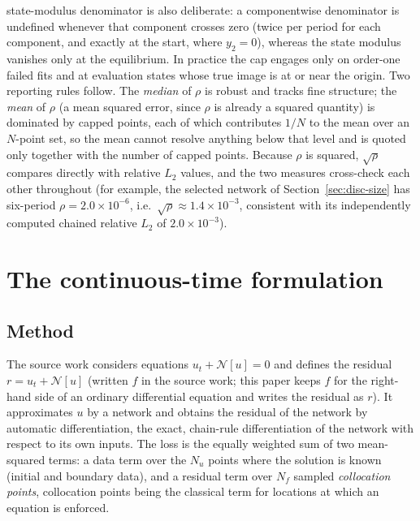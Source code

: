 \documentclass[11pt,a4paper]{article}
\begin{document}
\begin{enumerate}
  state-modulus denominator is also deliberate: a
  componentwise denominator is undefined whenever that component crosses
  zero (twice per period for each component, and exactly at the start,
  where $y_2 = 0$), whereas the state modulus vanishes only at the
  equilibrium. In practice the cap engages only on order-one failed fits
  and at evaluation states whose true image is at or near the origin.
  Two reporting rules follow. The \emph{median} of $\rho$ is robust and
  tracks fine structure; the \emph{mean} of $\rho$ (a mean squared
  error, since $\rho$ is already a squared quantity) is dominated by
  capped points, each of which contributes $1/N$ to the mean over an
  $N$-point set, so the mean cannot resolve anything below that level
  and is quoted only together with the number of capped points. Because
  $\rho$ is squared, $\sqrt{\rho}$ compares directly with relative $L_2$
  values, and the two measures cross-check each other throughout (for
  example, the selected network of Section~\ref{sec:disc-size} has
  six-period $\rho = 2.0\times10^{-6}$, i.e.\
  $\sqrt{\rho} \approx 1.4\times10^{-3}$, consistent with its
  independently computed chained relative $L_2$ of $2.0\times10^{-3}$).
\end{enumerate}

\section{The continuous-time formulation}
\label{sec:cont-method}

\subsection{Method}

The source work considers equations $u_t + \mathcal{N}[u] = 0$ and defines
the residual $ r = u_t + \mathcal{N}[u]$ (written $f$ in the source work; this
paper keeps $f$ for the right-hand side of an ordinary differential
equation and writes the residual as $r$). It approximates $u$ by a
network and obtains the residual of the network by automatic
differentiation, the exact, chain-rule differentiation of the network
with respect to its own inputs. The loss is the equally weighted sum of
two mean-squared terms: a data term over the $N_u$ points where the
solution is known (initial and boundary data), and a residual term over
$N_f$ sampled \emph{collocation points},
collocation points being the classical term for locations at which an
equation is enforced.
\end{document}
